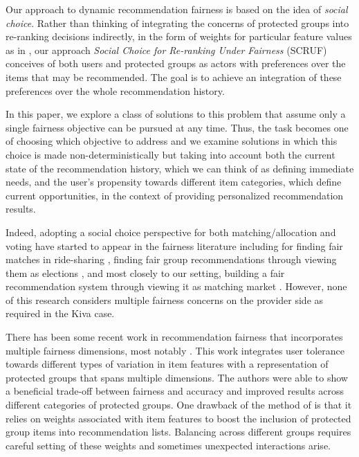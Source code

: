 Our approach to dynamic recommendation fairness is based on the idea of \textit{social choice}. Rather than thinking of integrating the concerns of protected groups into re-ranking decisions indirectly, in the form of weights for particular feature values as in \cite{sonboli-umap-2020}, our approach \textit{Social Choice for Re-ranking Under Fairness} (SCRUF) conceives of both users and protected groups as actors with preferences over the items that may be recommended. The goal is to achieve an integration of these preferences over the whole recommendation history. 

In this paper, we explore a class of solutions to this problem that assume only a single fairness objective can be pursued at any time. Thus, the task becomes one of choosing which objective to address and we examine solutions in which this choice is made non-deterministically but taking into account both the current state of the recommendation history, which we can think of as defining immediate needs, and the user's propensity towards different item categories, which define current opportunities, in the context of providing personalized recommendation results. 

Indeed, adopting a social choice perspective for both matching/allocation and voting have started to appear in the fairness literature including for finding fair matches in ride-sharing \cite{suhr2019two}, finding fair group recommendations through viewing them as elections \cite{chakraborty2019equality}, and most closely to our setting, building a fair recommendation system through viewing it as matching market \cite{patro2020fairrec}. However, none of this research considers multiple fairness concerns on the provider side as required in the Kiva case. 

There has been some recent work in recommendation fairness that incorporates multiple fairness dimensions, most notably \cite{sonboli-umap-2020}. This work integrates user tolerance towards different types of variation in item features with a representation of protected groups that spans multiple dimensions. The authors were able to show a beneficial trade-off between fairness and accuracy and improved results across different categories of protected groups. One drawback of the method of \cite{sonboli-umap-2020} is that it relies on weights associated with item features to boost the inclusion of protected group items into recommendation lists. Balancing across different groups requires careful setting of these weights and sometimes unexpected interactions arise. 

